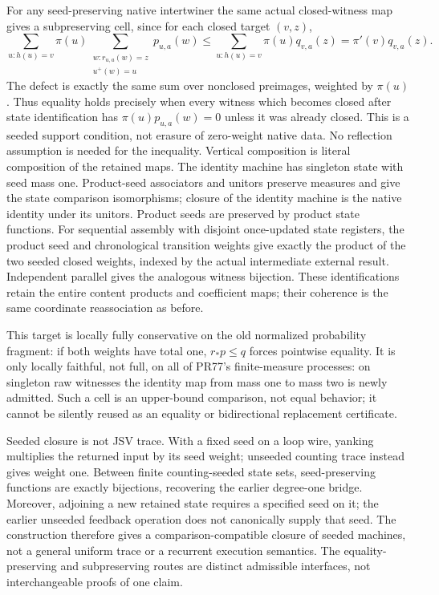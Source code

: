 \documentclass{article}
\begin{document}
For any seed-preserving native intertwiner the same actual closed-witness map gives a subpreserving cell, since for each closed target $(v,z)$,
\[
 \sum_{u:h(u)=v}\pi(u)
 \sum_{\substack{w:r_{u,a}(w)=z\\u^+(w)=u}}p_{u,a}(w)
 \le \sum_{u:h(u)=v}\pi(u)q_{v,a}(z)
 =\pi'(v)q_{v,a}(z).
\]
The defect is exactly the same sum over nonclosed preimages, weighted by $\pi(u)$. Thus equality holds precisely when every witness which becomes closed after state identification has $\pi(u)p_{u,a}(w)=0$ unless it was already closed. This is a seeded support condition, not erasure of zero-weight native data. No reflection assumption is needed for the inequality. Vertical composition is literal composition of the retained maps. The identity machine has singleton state with seed mass one. Product-seed associators and unitors preserve measures and give the state comparison isomorphisms; closure of the identity machine is the native identity under its unitors. Product seeds are preserved by product state functions. For sequential assembly with disjoint once-updated state registers, the product seed and chronological transition weights give exactly the product of the two seeded closed weights, indexed by the actual intermediate external result. Independent parallel gives the analogous witness bijection. These identifications retain the entire content products and coefficient maps; their coherence is the same coordinate reassociation as before.

This target is locally fully conservative on the old normalized probability fragment: if both weights have total one, $r_*p\le q$ forces pointwise equality. It is only locally faithful, not full, on all of PR77's finite-measure processes: on singleton raw witnesses the identity map from mass one to mass two is newly admitted. Such a cell is an upper-bound comparison, not equal behavior; it cannot be silently reused as an equality or bidirectional replacement certificate.

Seeded closure is not JSV trace. With a fixed seed on a loop wire, yanking multiplies the returned input by its seed weight; unseeded counting trace instead gives weight one. Between finite counting-seeded state sets, seed-preserving functions are exactly bijections, recovering the earlier degree-one bridge. Moreover, adjoining a new retained state requires a specified seed on it; the earlier unseeded feedback operation does not canonically supply that seed. The construction therefore gives a comparison-compatible closure of seeded machines, not a general uniform trace or a recurrent execution semantics. The equality-preserving and subpreserving routes are distinct admissible interfaces, not interchangeable proofs of one claim.
\end{document}
